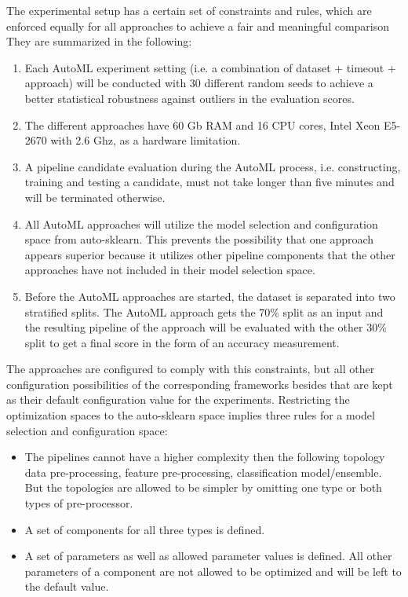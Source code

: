 The experimental setup has a certain set of constraints and rules, which are enforced equally for all approaches to achieve a fair and meaningful comparison
They are summarized in the following:
\begin{enumerate}
    \item Each AutoML experiment setting (i.e. a combination of dataset + timeout + approach) will be conducted with 30 different random seeds to achieve a better statistical robustness against outliers in the evaluation scores.
    \item The different approaches have 60 Gb RAM and 16 CPU cores, Intel Xeon E5-2670 with 2.6 Ghz, as a hardware limitation.
    \item A pipeline candidate evaluation during the AutoML process, i.e. constructing, training and testing a candidate, must not take longer than five minutes and will be terminated otherwise.
    \item All AutoML approaches will utilize the model selection and configuration space from auto-sklearn. This prevents the possibility that one approach appears superior because it utilizes other pipeline components that the other approaches have not included in their model selection space.
    \item Before the AutoML approaches are started, the dataset is separated into two stratified splits. The AutoML approach gets the 70\% split as an input and the resulting pipeline of the approach will be evaluated with the other 30\% split to get a final score in the form of an accuracy measurement.
\end{enumerate}
The approaches are configured to comply with this constraints, but all other configuration possibilities of the corresponding frameworks besides that are kept as their default configuration value for the experiments.\newline
Restricting the optimization spaces to the auto-sklearn space implies three rules for a model selection and configuration space:
\begin{itemize}
    \item The pipelines cannot have a higher complexity then the following topology data pre-processing, feature pre-processing, classification model/ensemble. But the topologies are allowed to be simpler by omitting one type or both types of pre-processor.
    \item A set of components for all three types is defined.
    \item A set of parameters as well as allowed parameter values is defined. All other parameters of a component are not allowed to be optimized and will be left to the default value.
\end{itemize}
